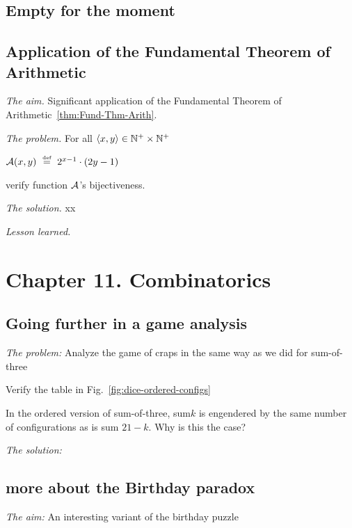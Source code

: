 \subsection{Empty for the moment}

\subsection{Application of the Fundamental Theorem of Arithmetic}

\noindent \textit{The aim.}
Significant application of the Fundamental Theorem of Arithmetic~\ref{thm:Fund-Thm-Arith}.
\medskip

\noindent \textit{The problem.}
For all $\langle x,y \rangle \in \mathbb{N}^+ \times \mathbb{N}^+$

$\mbox{$\cal A$}(x,y) \ \stackrel{\mbox{{\tiny def}}}{=} \ 2^{x-1} \cdot (2y -1)$

verify function $\mbox{$\cal A$}$'s bijectiveness.
\medskip

\noindent \textit{The solution.}
xx
\medskip

\noindent \textit{Lesson learned.}




\section{Chapter 11. Combinatorics}

\subsection{Going further in a game analysis}

\noindent \textit{The problem:}
Analyze the game of craps in the same way as we did for sum-of-three

Verify the table in Fig.~\ref{fig:dice-ordered-configs}

In the ordered version of sum-of-three, sum$k$ is engendered by the
same number of configurations as is sum $21 - k$.  
Why is this the case?

\noindent \textit{The solution:}


\subsection{more about the Birthday paradox}

\noindent \textit{The aim:}
An interesting variant of the birthday puzzle
\medskip


